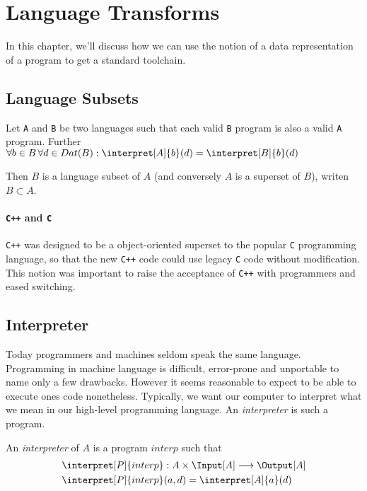 \section{Language Transforms} %
\label{sec:transforms}
In this chapter, we'll discuss how we can use the notion of a data 
representation of a program to get a standard toolchain.
\subsection{Language Subsets} %
\label{sub:Language Subsets}
\begin{defn}
	Let {\tt A} and {\tt B} be two languages such that each valid {\tt B} 
	program is also a valid {\tt A} program. Further 
	$\forall b\in B\, \forall d\in Dat(B): \interpret[A]{b}(d) = \interpret[B]{b}(d)$

	Then $B$ is a language subset of $A$ (and conversely $A$ is a superset of
	$B$), writen $B \subset A$.
\end{defn}
\paragraph{{\tt C++}  and {\tt C} } %
\label{par:Cpp and C}
{\tt C++} was designed to be a object-oriented superset to the popular {\tt C}
programming language, so that the new {\tt C++} code could use legacy {\tt C}
code without modification. This notion was important to raise the acceptance of
{\tt C++} with programmers and eased switching.
\subsection{Interpreter} %
\label{sub:Interpreter}
Today programmers and machines seldom speak the same language. Programming in 
machine language is difficult, error-prone and unportable to name only a few 
drawbacks. However it seems reasonable to expect to be able to execute ones 
code nonetheless. Typically, we want our computer to interpret what we mean 
in our high-level programming language. An \emph{interpreter} is such a program.

\begin{defn}
	An \emph{interpreter} of $A$ is a program $interp$ such that
	\begin{align*}
			\interpret[P]{interp}&: A \times \Input[A] \longrightarrow \Output[A] \\
			\interpret[P]{interp}&(a, d) = \interpret[A]{a}(d)
	\end{align*}
\end{defn}

